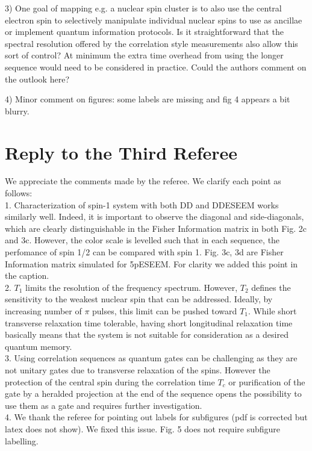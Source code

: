\documentclass[12pt]{amsart}
\begin{document}
	3) One goal of mapping e.g. a nuclear spin cluster is to also use the
	central electron spin to selectively manipulate individual nuclear
	spins to use as ancillae or implement quantum information protocols.
	Is it straightforward that the spectral resolution offered by the
	correlation style measurements also allow this sort of control? At
	minimum the extra time overhead from using the longer sequence would
	need to be considered in practice. Could the authors comment on the
	outlook here?
	
	4) Minor comment on figures: some labels are missing and fig 4 appears
	a bit blurry.
	
	\color{black} \section*{ Reply to the Third Referee}
	We appreciate the comments made by the referee. We clarify each point as follows:\\
	
	1. Characterization of spin-1 system with both DD and DDESEEM works similarly well. Indeed, it is important to observe the diagonal and side-diagonals, which are clearly distinguishable in the Fisher Information matrix in both Fig. 2c and 3c. However, the color scale is levelled such that in each sequence, the perfomance of spin 1/2 can be compared with spin 1. Fig. 3c, 3d are Fisher Information matrix simulated for 5pESEEM. For clarity we added this point in the caption.\\
	
	2. $T_1$ limits the resolution of the frequency spectrum. However, $T_2$ defines the sensitivity to the weakest nuclear spin that can be addressed. Ideally, by increasing number of $\pi$ pulses, this limit can be pushed toward $T_1$. While short transverse relaxation time tolerable, having short longitudinal relaxation time basically means that the system is not suitable for consideration as a desired quantum memory. \\
	
	3. Using correlation sequences as quantum gates can be challenging as they are not unitary gates due to transverse relaxation of the spins. However the protection of the central spin during the correlation time $T_c$ or purification of the gate by a heralded projection at the end of the sequence opens the possibility to use them as a gate and requires further investigation.\\
	
	4. We thank the referee for pointing out labels for subfigures (pdf is corrected but latex does not show). We fixed this issue. Fig. 5 does not require subfigure labelling.
\end{document}
